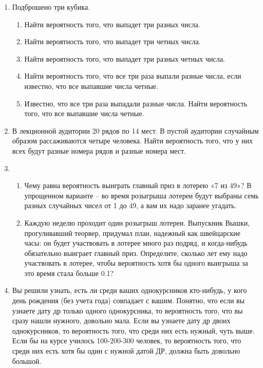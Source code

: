 \documentclass{article}
\begin{document}
\begin{enumerate}
    \item Подброшено три кубика.
    \begin{enumerate}
        \item Найти вероятность того, что выпадет три разных числа.
        \item Найти вероятность того, что выпадет три четных числа.
        \item Найти вероятность того, что выпадет три разных четных числа.
        \item Найти вероятность того, что все три раза выпали разные числа, если известно, что все выпавшие числа четные.
        \item Известно, что все три раза выпадали разные числа. Найти вероятность того, что все выпавшие числа четные.
    \end{enumerate}

    \item В лекционной аудитории 20 рядов по 14 мест. В пустой аудитории случайным образом рассаживаются четыре человека. Найти вероятность того, что у них всех будут разные номера рядов и разные номера мест.

    \item 
    \begin{enumerate}
        \item Чему равна вероятность выиграть главный приз в лотерею «7 из 49»? В упрощенном варианте -- во время розыгрыша лотереи будут выбраны семь разных случайных чисел от 1 до 49, а вам их надо заранее угадать.
        \item Каждую неделю проходит один розыгрыш лотереи. Выпускник Вышки, прогуливавший теорвер, придумал план, надежный как швейцарские часы: он будет участвовать в лотерее много раз подряд, и когда-нибудь обязательно выиграет главный приз. Определите, сколько лет ему надо участвовать в лотерее, чтобы вероятность хотя бы одного выигрыша за это время стала больше 0.1?
    \end{enumerate}

    \item Вы решили узнать, есть ли среди ваших однокурсников кто-нибудь, у кого день рождения (без учета года) совпадает с вашим.
    Понятно, что если вы узнаете дату др только одного однокурсника, то вероятность того, что вы сразу нашли нужного, довольно мала. 
    Если вы узнаете дату др двоих однокурсников, то вероятность того, что среди них есть нужный, чуть выше. 
    Если бы на курсе училось 100-200-300 человек, то вероятность того, что среди них есть хотя бы один с нужной датой ДР, должна быть довольно большой.


\end{enumerate}
\end{document}
